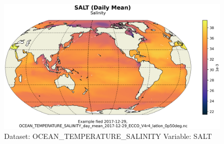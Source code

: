 \begin{figure}[H]
\centering
\includegraphics[scale=0.55]{../images/plots/latlon_plots/Ocean_Temperature_and_Salinity/SALT.png}
\caption{Dataset: OCEAN\_TEMPERATURE\_SALINITY Variable: SALT}
\label{tab:table-OCEAN_TEMPERATURE_SALINITY_SALT-Plot}
\end{figure}
\pagebreak
